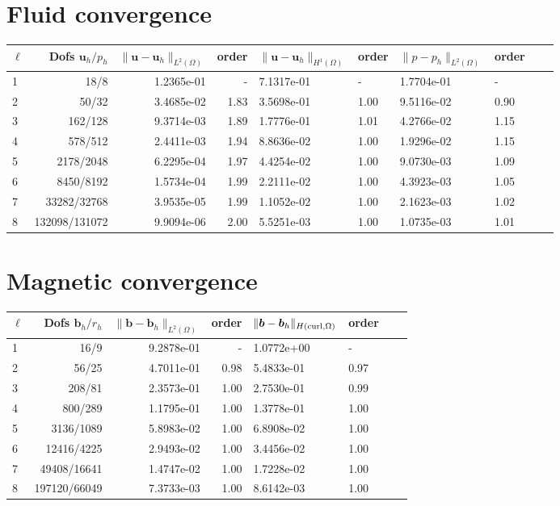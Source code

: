 \documentclass{article}
\newcommand{\uu}[1]{\boldsymbol #1}
\begin{document}
\section*{Fluid convergence}

\begin{tabular}{lrrrllllll}
\hline
    $\ell$ &    Dofs $\uu{u}_h/p_h$ & $\|\uu{u}-\uu{u}_h\|_{L^2(\Omega)}$ & order & $\|\uu{u}-\uu{u}_h\|_{H^1(\Omega)}$ & order & $\|{p}-{p}_h\|_{L^2(\Omega)}$ & order  \\
\hline
1 &      18/8 &  1.2365e-01 &     - &  7.1317e-01 &     - &  1.7704e-01 &      - \\
2 &      50/32 &  3.4685e-02 &     1.83 &  3.5698e-01 &     1.00 &  9.5116e-02 &      0.90 \\
3 &     162/128 &  9.3714e-03 &     1.89 &  1.7776e-01 &     1.01 &  4.2766e-02 &      1.15 \\
4 &     578/512 &  2.4411e-03 &     1.94 &  8.8636e-02 &     1.00 &  1.9296e-02 &      1.15 \\
5 &    2178/2048 &  6.2295e-04 &     1.97 &  4.4254e-02 &     1.00 &  9.0730e-03 &      1.09 \\
6 &    8450/8192 &  1.5734e-04 &     1.99 &  2.2111e-02 &     1.00 &  4.3923e-03 &      1.05 \\
7 &   33282/32768 &  3.9535e-05 &     1.99 &  1.1052e-02 &     1.00 &  2.1623e-03 &      1.02 \\
8 &  132098/131072 &  9.9094e-06 &     2.00 &  5.5251e-03 &     1.00 &  1.0735e-03 &      1.01 \\
\hline
\end{tabular}



\section*{Magnetic convergence}

\begin{tabular}{lrrrllll}
\hline
$\ell$ &    Dofs $\uu{b}_h/r_h$ & $\|\uu{b}-\uu{b}_h\|_{L^2(\Omega)}$ & order & $\|\uu{b}-\uu{b}_h\|_{H({\rm curl},\Omega)}$ & order \\
\hline
1 &      16/9 &  9.2878e-01 &     - &  1.0772e+00 &        - \\
2 &      56/25 &  4.7011e-01 &     0.98 &  5.4833e-01 &        0.97 \\
3 &     208/81 &  2.3573e-01 &     1.00 &  2.7530e-01 &        0.99 \\
4 &     800/289 &  1.1795e-01 &     1.00 &  1.3778e-01 &        1.00 \\
5 &    3136/1089 &  5.8983e-02 &     1.00 &  6.8908e-02 &        1.00 \\
6 &   12416/4225 &  2.9493e-02 &     1.00 &  3.4456e-02 &        1.00 \\
7 &   49408/16641 &  1.4747e-02 &     1.00 &  1.7228e-02 &        1.00 \\
8 &  197120/66049 &  7.3733e-03 &     1.00 &  8.6142e-03 &        1.00 \\
\hline
\end{tabular}
\end{document}
